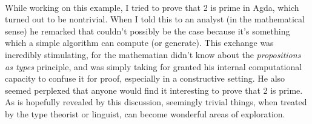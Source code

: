 \begin{code}
\AgdaSymbol{:}\AgdaSpace{}%
\<%
\\
\>[0]\AgdaSpace{}%
\AgdaSymbol{=}\AgdaSpace{}%
\AgdaSymbol{(}\AgdaSpace{}%
\AgdaSymbol{:}\AgdaSpace{}%
\AgdaSymbol{)}\AgdaSpace{}%
\<%
\\
\>[0][@{}l@{\AgdaIndent{0}}]%
\>[2]\AgdaFunction{Σ[}\AgdaSpace{}%
\AgdaSpace{}%
\AgdaOperator{\AgdaInductiveConstructor{,}}\AgdaSpace{}%
\AgdaSymbol{)}\AgdaSpace{}%
\AgdaSpace{}%
\AgdaSpace{}%
\AgdaFunction{]}\<%
\\
%
\>[2]\AgdaFunction{Σ[}\AgdaSpace{}%
\AgdaSpace{}%
\AgdaOperator{\AgdaInductiveConstructor{,}}\AgdaSpace{}%
\AgdaSymbol{)}\AgdaSpace{}%
\AgdaSpace{}%
\AgdaSpace{}%
\AgdaFunction{]}\<%
\\
%
\>[2]\AgdaFunction{Σ[}\AgdaSpace{}%
\AgdaSpace{}%
%
\>[21]\AgdaSpace{}%
\AgdaSpace{}%
\AgdaSpace{}%
\AgdaFunction{]}\<%
\\
\>[2][@{}l@{\AgdaIndent{0}}]%
\>[4]\AgdaSymbol{(}\AgdaSpace{}%
\AgdaSpace{}%
\AgdaSymbol{)}\<%
\\
%
\>[2]\AgdaSpace{}%
\AgdaSpace{}%
\AgdaSymbol{(}\AgdaSpace{}%
\AgdaOperator{\AgdaInductiveConstructor{,}}\AgdaSpace{}%
\AgdaSpace{}%
\AgdaOperator{\AgdaInductiveConstructor{,}}\AgdaSpace{}%
\AgdaSymbol{)}\<%
\end{code}

While working on this example, I tried to prove that 2 is prime in Agda, which turned out to be nontrivial. When I told this to an analyst (in the mathematical sense) he remarked that couldn't possibly be the case because it's something which a simple algorithm can compute (or generate). This exchange was incredibly stimulating, for the mathematian didn't know about the \emph{propositions as types} principle, and was simply taking for granted his internal computational capacity to confuse it for proof, especially in a constructive setting. He also seemed perplexed that anyone would find it interesting to prove that 2 is prime. As is hopefully revealed by this discussion, seemingly trivial things, when treated by the type theorist or linguist, can become wonderful areas of exploration.
